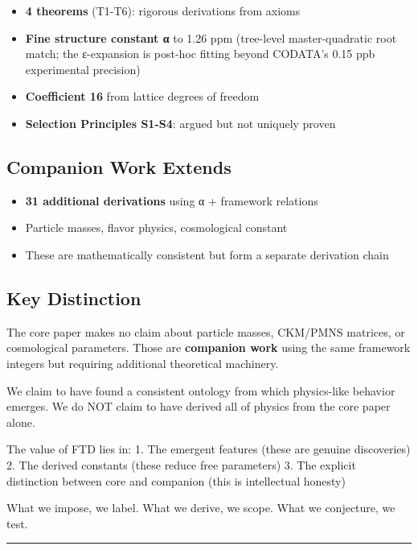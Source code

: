 \documentclass[
  11pt,
  letterpaper,
  twoside,
  openany]{book}
\makeatletter
\providecommand{\tightlist}{%
  \setlength{\itemsep}{0pt}\setlength{\parskip}{0pt}}
\let\orig@subsection\subsection
\renewcommand{\subsection}{\needspace{6\baselineskip}\orig@subsection}
\makeatother
\begin{document}
\begin{itemize}
\tightlist
\item
  \textbf{4 theorems} (T1-T6): rigorous derivations from axioms
\item
  \textbf{Fine structure constant α} to 1.26 ppm (tree-level
  master-quadratic root match; the ε-expansion is post-hoc fitting
  beyond CODATA's 0.15 ppb experimental precision)
\item
  \textbf{Coefficient 16} from lattice degrees of freedom
\item
  \textbf{Selection Principles S1-S4}: argued but not uniquely proven
\end{itemize}

\subsection{Companion Work Extends}\label{companion-work-extends}

\begin{itemize}
\tightlist
\item
  \textbf{31 additional derivations} using α + framework relations
\item
  Particle masses, flavor physics, cosmological constant
\item
  These are mathematically consistent but form a separate derivation
  chain
\end{itemize}

\subsection{Key Distinction}\label{key-distinction}

The core paper makes no claim about particle masses, CKM/PMNS matrices,
or cosmological parameters. Those are \textbf{companion work} using the
same framework integers but requiring additional theoretical machinery.

We claim to have found a consistent ontology from which physics-like
behavior emerges. We do NOT claim to have derived all of physics from
the core paper alone.

The value of FTD lies in: 1. The emergent features (these are genuine
discoveries) 2. The derived constants (these reduce free parameters) 3.
The explicit distinction between core and companion (this is
intellectual honesty)

What we impose, we label. What we derive, we scope. What we conjecture,
we test.

\begin{center}\rule{0.5\linewidth}{0.5pt}\end{center}
\end{document}

